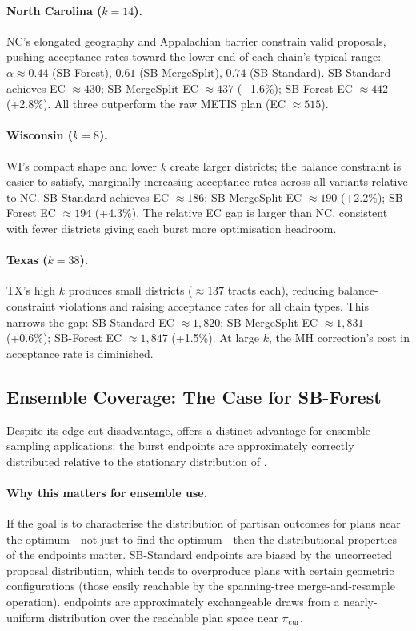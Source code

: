 \paragraph{North Carolina ($k=14$).}
NC's elongated geography and Appalachian barrier constrain valid proposals,
pushing acceptance rates toward the lower end of each chain's typical range:
$\bar\alpha \approx 0.44$ (SB-Forest), $0.61$ (SB-MergeSplit), $0.74$
(SB-Standard).
SB-Standard achieves EC $\approx 430$; SB-MergeSplit EC $\approx 437$ (+1.6\%);
SB-Forest EC $\approx 442$ (+2.8\%).
All three outperform the raw METIS plan (EC $\approx 515$).

\paragraph{Wisconsin ($k=8$).}
WI's compact shape and lower $k$ create larger districts; the balance
constraint is easier to satisfy, marginally increasing acceptance rates
across all variants relative to NC.
SB-Standard achieves EC $\approx 186$; SB-MergeSplit EC $\approx 190$ (+2.2\%);
SB-Forest EC $\approx 194$ (+4.3\%).
The relative EC gap is larger than NC, consistent with fewer districts
giving each burst more optimisation headroom.

\paragraph{Texas ($k=38$).}
TX's high $k$ produces small districts ($\approx 137$ tracts each),
reducing balance-constraint violations and raising acceptance rates for all
chain types.
This narrows the gap: SB-Standard EC $\approx 1{,}820$; SB-MergeSplit
EC $\approx 1{,}831$ (+0.6\%); SB-Forest EC $\approx 1{,}847$ (+1.5\%).
At large $k$, the MH correction's cost in acceptance rate is diminished.

\subsection{Ensemble Coverage: The Case for SB-Forest}

Despite its edge-cut disadvantage, \sbf{} offers a distinct advantage for
ensemble sampling applications: the burst endpoints are approximately
correctly distributed relative to the stationary distribution of
\frecom{}.

\paragraph{Why this matters for ensemble use.}
If the goal is to characterise the distribution of partisan outcomes for
plans near the optimum---not just to find the optimum---then the
distributional properties of the endpoints matter.
SB-Standard endpoints are biased by the uncorrected \recom{} proposal
distribution, which tends to overproduce plans with certain geometric
configurations (those easily reachable by the spanning-tree merge-and-resample
operation).
\sbf{} endpoints are approximately exchangeable draws from a nearly-uniform
distribution over the reachable plan space near $\pi_{\mathrm{cur}}$.

